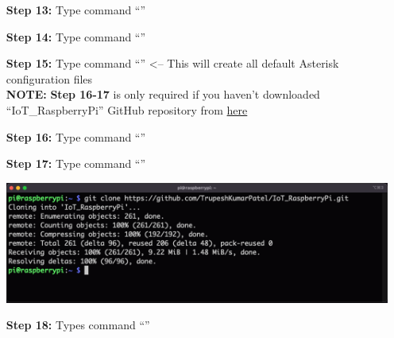 \begin{itemize}[leftmargin=1.7cm]
			\item[\textbf{Step 13:}] Type command ``{\selectfont{sudo make}}''
			\item[\textbf{Step 14:}] Type command ``{\selectfont{sudo make install}}''
			\item[\textbf{Step 15:}] Type command ``{\selectfont{sudo make samples}}'' <-- This will create all default Asterisk configuration files\\
			\danger\textbf{NOTE:} \textbf{Step 16-17} is only required if you haven't downloaded ``IoT\_RaspberryPi'' GitHub repository from \href{https://github.com/TrupeshKumarPatel/IoT_RaspberryPi}{here}  \danger
			\item[\textbf{Step 16\danger:}] Type command ``{\selectfont{cd ~}}''
			\item[\textbf{Step 17\danger:}] Type command ``{\selectfont{git clone https://github.\\com/TrupeshKumarPatel/IoT\_Raspberry\\Pi.git}}''\\
				\begin{minipage}{\textwidth}
					\vspace{2mm}
					\includegraphics[scale=0.17]{Images/raspberry_pi/eduroam_config/clone_git.png}
					\vspace{2mm}
				\end{minipage}
			\item[\textbf{Step 18:}] Types command ``{\selectfont{sudo cp -R ~/IoT\_Rasp\\berryPi/source\_code/asterisk\_config/* /etc/asterisk/}}''
		\end{itemize}

